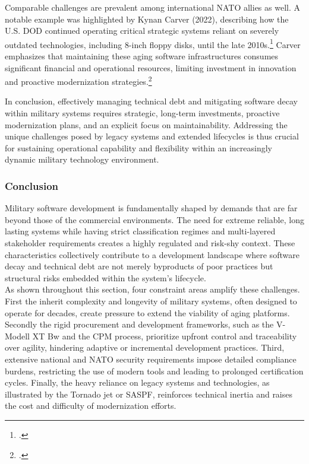 Comparable challenges are prevalent among international NATO allies as well. A notable example was highlighted by Kynan Carver (2022), describing how the U.S. \ac{DOD} continued operating critical strategic systems reliant on severely outdated technologies, 
including 8-inch floppy disks, until the late 2010s.\footcite{carverTechnicalDebtCybersecurity2022} Carver emphasizes that maintaining these aging software infrastructures consumes significant financial and operational resources, limiting investment in innovation and proactive modernization strategies.\footcite{carverTechnicalDebtCybersecurity2022}

In conclusion, effectively managing technical debt and mitigating software decay within military systems requires strategic, long-term investments, proactive modernization plans, and an explicit focus on maintainability. Addressing the unique challenges posed by legacy 
systems and extended lifecycles is thus crucial for sustaining operational capability and flexibility within an increasingly dynamic military technology environment.

\subsubsection{Conclusion}
Military software development is fundamentally shaped by demands that are far beyond those of the commercial environments. The need for extreme reliable, long lasting systems while having strict classification regimes and multi-layered stakeholder requirements creates a highly regulated and risk-shy context.
These characteristics collectively contribute to a development landscape where software decay and technical debt are not merely byproducts of poor practices but structural risks embedded within the system's lifecycle.\\

As shown throughout this section, four constraint areas amplify these challenges. First the inherit complexity and longevity of military systems, often designed to operate for decades, create pressure to extend the viability of aging platforms.
Secondly the rigid procurement and development frameworks, such as the V-Modell XT Bw and the \ac{CPM} process, prioritize upfront control and traceability over agility, hindering adaptive or incremental development practices.
Third, extensive national and NATO security requirements impose detailed compliance burdens, restricting the use of modern tools and leading to prolonged certification cycles. Finally, the heavy reliance on legacy systems and technologies, as illustrated by the Tornado jet or SASPF, 
reinforces technical inertia and raises the cost and difficulty of modernization efforts.\\

